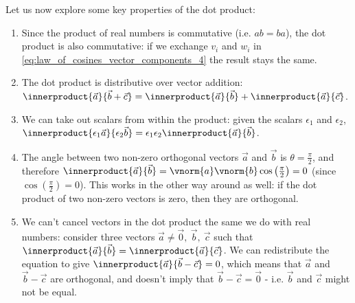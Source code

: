 Let us now explore some key properties of the dot product:
\begin{enumerate}
	\item Since the product of real numbers is commutative (i.e. $ab=ba$), the dot product is also commutative: if we exchange $v_{i}$ and $w_{i}$ in \autoref{eq:law_of_cosines_vector_components_4} the result stays the same.
	\item The dot product is distributive over vector addition: $\innerproduct{\vec{a}}{\vec{b}+\vec{c}} = \innerproduct{\vec{a}}{\vec{b}} + \innerproduct{\vec{a}}{\vec{c}}$.
	\item We can take out scalars from within the product: given the scalars $\epsilon_{1}$ and $\epsilon_{2}$, $\innerproduct{\epsilon_{1}\vec{a}}{\epsilon_{2}\vec{b}} = \epsilon_{1}\epsilon_{2}\innerproduct{\vec{a}}{\vec{b}}$.
	\item The angle between two non-zero orthogonal vectors $\vec{a}$ and $\vec{b}$ is $\theta=\frac{\pi}{2}$, and therefore $\innerproduct{\vec{a}}{\vec{b}} = \vnorm{a}\vnorm{b}\cos\left(\frac{\pi}{2}\right) = 0$ (since $\cos\left(\frac{\pi}{2}\right)=0$). This works in the other way around as well: if the dot product of two non-zero vectors is zero, then they are orthogonal.
	\item We can't cancel vectors in the dot product the same we do with real numbers: consider three vectors $\vec{a}\neq\vec{0},\ \vec{b},\ \vec{c}$ such that $\innerproduct{\vec{a}}{\vec{b}}=\innerproduct{\vec{a}}{\vec{c}}$. We can redistribute the equation to give $\innerproduct{\vec{a}}{\vec{b}-\vec{c}}=0$, which means that $\vec{a}$ and $\vec{b}-\vec{c}$ are orthogonal, and doesn't imply that $\vec{b}-\vec{c}=\vec{0}$ - i.e. $\vec{b}$ and $\vec{c}$ might not be equal.
\end{enumerate}



